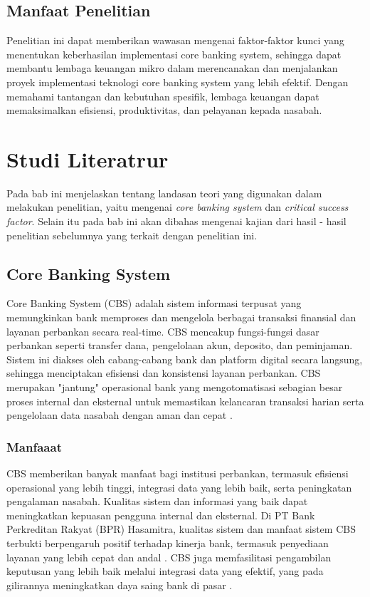 \documentclass[journal,article,submit,pdftex,moreauthors]{Definitions/mdpi}
\begin{document}
\subsection{Manfaat Penelitian}
Penelitian ini dapat memberikan wawasan mengenai faktor-faktor kunci yang menentukan keberhasilan implementasi core banking system, sehingga dapat membantu lembaga keuangan mikro dalam merencanakan dan menjalankan proyek implementasi teknologi core banking system yang lebih efektif. Dengan memahami tantangan dan kebutuhan spesifik, lembaga keuangan dapat memaksimalkan efisiensi, produktivitas, dan pelayanan kepada nasabah.


\section{Studi Literatrur}

Pada bab ini menjelaskan tentang landasan teori yang digunakan dalam melakukan penelitian, yaitu mengenai \textit{core banking system} dan \textit{critical success factor}. Selain itu pada bab ini akan dibahas mengenai kajian dari hasil - hasil penelitian sebelumnya yang terkait dengan penelitian ini.

\subsection{Core Banking System}

Core Banking System (CBS) adalah sistem informasi terpusat yang memungkinkan bank memproses dan mengelola berbagai transaksi finansial dan layanan perbankan secara real-time. CBS mencakup fungsi-fungsi dasar perbankan seperti transfer dana, pengelolaan akun, deposito, dan peminjaman. Sistem ini diakses oleh cabang-cabang bank dan platform digital secara langsung, sehingga menciptakan efisiensi dan konsistensi layanan perbankan. CBS merupakan "jantung" operasional bank yang mengotomatisasi sebagian besar proses internal dan eksternal untuk memastikan kelancaran transaksi harian serta pengelolaan data nasabah dengan aman dan cepat \cite{Hsiao-ebanking}.

\subsubsection{Manfaaat}

CBS memberikan banyak manfaat bagi institusi perbankan, termasuk efisiensi operasional yang lebih tinggi, integrasi data yang lebih baik, serta peningkatan pengalaman nasabah. Kualitas sistem dan informasi yang baik dapat meningkatkan kepuasan pengguna internal dan eksternal. Di PT Bank Perkreditan Rakyat (BPR) Hasamitra, kualitas sistem dan manfaat sistem CBS terbukti berpengaruh positif terhadap kinerja bank, termasuk penyediaan layanan yang lebih cepat dan andal \cite{basyir-cbs}. CBS juga memfasilitasi pengambilan keputusan yang lebih baik melalui integrasi data yang efektif, yang pada gilirannya meningkatkan daya saing bank di pasar \cite{pratama-cbs}.
\end{document}
